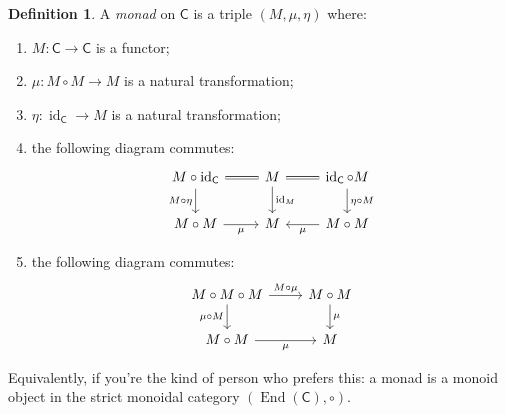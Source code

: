 \documentclass{article}
\theoremstyle{definition}
\newtheorem{defn}{Definition}
\newcommand{\C}{\mathsf{C}}
\DeclareMathOperator{\id}{id}
\begin{document}
\begin{defn}
A \emph{monad} on $\C$ is a triple $(M, \mu, \eta)$ where:
\begin{enumerate}[label = (\roman*.)]
    \item $M : \C \to \C$ is a functor;
    \item $\mu : M \circ M \to M$ is a natural transformation;
    \item $\eta : \id_\C \to M$ is a natural transformation;
    \item the following diagram commutes:
    \[\begin{tikzcd}[ampersand replacement=\&]
    	{M \circ \id_\C} \& M \& {\id_\C \circ M} \\
    	{M \circ M} \& M \& {M \circ M}
    	\arrow[equals, from=1-1, to=1-2]
    	\arrow[equals, from=1-2, to=1-3]
    	\arrow["{M \circ \eta}"', from=1-1, to=2-1]
    	\arrow["{\eta \circ M}", from=1-3, to=2-3]
    	\arrow["\mu"', from=2-1, to=2-2]
    	\arrow["\mu", from=2-3, to=2-2]
    	\arrow["{\id_M}", from=1-2, to=2-2]
    \end{tikzcd}\]
    \item the following diagram commutes:
    \[\begin{tikzcd}[ampersand replacement=\&]
    	{M \circ M \circ M} \& {M \circ M} \\
    	{M \circ M} \& M
    	\arrow["{M \circ \mu}", from=1-1, to=1-2]
    	\arrow["{\mu \circ M}"', from=1-1, to=2-1]
    	\arrow["\mu"', from=2-1, to=2-2]
    	\arrow["\mu", from=1-2, to=2-2]
    \end{tikzcd}\]
\end{enumerate}
Equivalently, if you're the kind of person who prefers this: a monad is a monoid object in the strict monoidal category $(\operatorname{End}(\C), \circ)$.
\end{defn}
\end{document}
